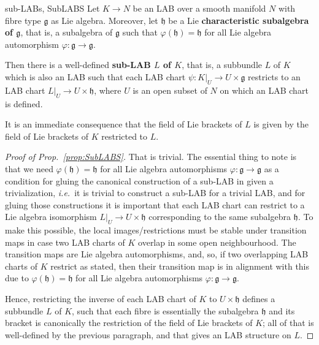 \begin{propositions}{sub-LABs, \cite[Proposition 3.3.9; page 105]{mackenzieGeneralTheory}}{SubLABS}
Let $K\to N$ be an LAB over a smooth manifold $N$ with fibre type $\mathfrak{g}$ as Lie algebra. Moreover, let $\mathfrak{h}$ be a Lie \textbf{characteristic subalgebra of $\mathfrak{g}$}, that is, a subalgebra of $\mathfrak{g}$ such that $\varphi(\mathfrak{h}) = \mathfrak{h}$ for all Lie algebra automorphism $\varphi: \mathfrak{g} \to \mathfrak{g}$. 

Then there is a well-defined \textbf{sub-LAB $L$ of $K$}, that is, a subbundle $L$ of $K$ which is also an LAB such that each LAB chart $\psi: K|_U \to U \times \mathfrak{g}$ restricts to an LAB chart $L|_U \to U \times \mathfrak{h}$, where $U$ is an open subset of $N$ on which an LAB chart is defined.
\end{propositions}

\begin{remark}
\leavevmode\newline
It is an immediate consequence that the field of Lie brackets of $L$ is given by the field of Lie brackets of $K$ restricted to $L$.
\end{remark}

\begin{proof}[Proof of Prop.~\ref{prop:SubLABS}]
\leavevmode\newline
That is trivial. The essential thing to note is that we need $\varphi(\mathfrak{h}) = \mathfrak{h}$ for all Lie algebra automorphisms $\varphi: \mathfrak{g} \to \mathfrak{g}$ as a condition for gluing the canonical construction of a sub-LAB in given a trivialization, \textit{i.e.}~it is trivial to construct a sub-LAB for a trivial LAB, and for gluing those constructions it is important that each LAB chart can restrict to a Lie algebra isomorphism $L|_U \to U \times \mathfrak{h}$ corresponding to the same subalgebra $\mathfrak{h}$. To make this possible, the local images/restrictions must be stable under transition maps in case two LAB charts of $K$ overlap in some open neighbourhood. The transition maps are Lie algebra automorphisms, and, so, if two overlapping LAB charts of $K$ restrict as stated, then their transition map is in alignment with this due to $\varphi(\mathfrak{h}) = \mathfrak{h}$ for all Lie algebra automorphisms $\varphi: \mathfrak{g} \to \mathfrak{g}$.

Hence, restricting the inverse of each LAB chart of $K$ to $U \times \mathfrak{h}$ defines a subbundle $L$ of $K$, such that each fibre is essentially the subalgebra $\mathfrak{h}$ and its bracket is canonically the restriction of the field of Lie brackets of $K$; all of that is well-defined by the previous paragraph, and that gives an LAB structure on $L$.
\end{proof}

